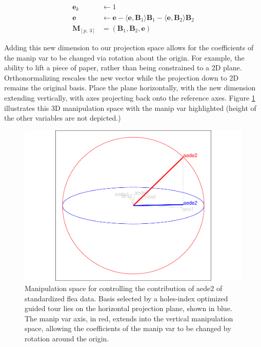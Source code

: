 \begin{align*}
  \textbf{e}_k &\leftarrow 1 \\ 
  \textbf{e}   &\leftarrow \textbf{e} - \langle \textbf{e}, \textbf{B}_1 \rangle \textbf{B}_1 - \langle \textbf{e}, \textbf{B}_2 \rangle \textbf{B}_2 \\ 
  \textbf{M}_{[p,~3]} &= (\textbf{B}_1,\textbf{B}_2,\textbf{e})
\end{align*}

Adding this new dimension to our projection space allows for the
coefficients of the manip var to be changed via rotation about the
origin. For example, the ability to lift a piece of paper, rather than
being constrained to a 2D plane. Orthonormalizing rescales the new
vector while the projection down to 2D remains the original basis. Place
the plane horizontally, with the new dimension extending vertically,
with axes projecting back onto the reference axes. Figure
\ref{fig:step2} illustrates this 3D manipulation space with the manip
var highlighted (height of the other variables are not depicted.)

\begin{Schunk}
\begin{figure}

{\centering \includegraphics[width=0.7\linewidth]{spinifex_paper_files/figure-latex/step2-1} 

}

\caption[Manipulation space for controlling the contribution of aede2 of standardized flea data]{Manipulation space for controlling the contribution of aede2 of standardized flea data. Basis selected by a holes-index optimized guided tour lies on the horizontal projection plane, shown in blue. The manip var axis, in red, extends into the vertical manipulation space, allowing the coefficients of the manip var to be changed by rotation around the origin.}\label{fig:step2}
\end{figure}
\end{Schunk}

